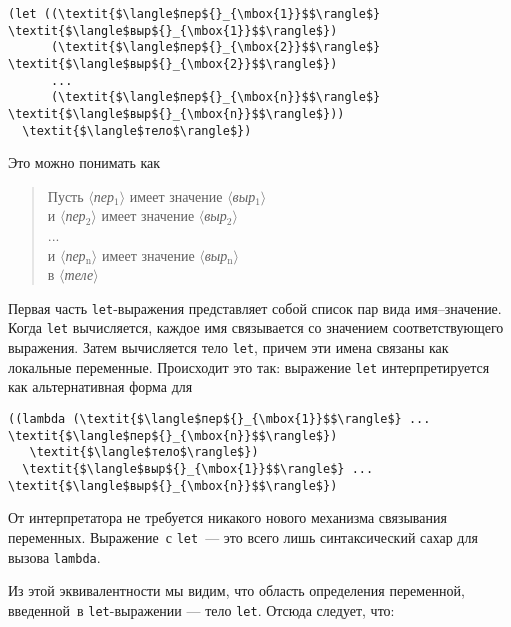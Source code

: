 \begin{Verbatim}[fontsize=\small]
(let ((\textit{$\langle$пер${}_{\mbox{1}}$$\rangle$} \textit{$\langle$выр${}_{\mbox{1}}$$\rangle$})
      (\textit{$\langle$пер${}_{\mbox{2}}$$\rangle$} \textit{$\langle$выр${}_{\mbox{2}}$$\rangle$})
      ...
      (\textit{$\langle$пер${}_{\mbox{n}}$$\rangle$} \textit{$\langle$выр${}_{\mbox{n}}$$\rangle$}))
  \textit{$\langle$тело$\rangle$})
\end{Verbatim}
Это можно понимать как

\begin{quote}
Пусть \textit{$\langle$пер${}_{\mbox{1}}$$\rangle$} имеет значение
\textit{$\langle$выр${}_{\mbox{1}}$$\rangle$}\\
и \textit{$\langle$пер${}_{\mbox{2}}$$\rangle$} имеет значение \textit{$\langle$выр${}_{\mbox{2}}$$\rangle$}\\
...\\
и \textit{$\langle$пер${}_{\mbox{n}}$$\rangle$} имеет значение \textit{$\langle$выр${}_{\mbox{n}}$$\rangle$}\\
в \textit{$\langle$теле$\rangle$}
\end{quote}
Первая часть {\tt let}-выражения представляет собой список пар
вида имя--зна\-че\-ние. Когда {\tt let} вычисляется, каждое имя
связывается со значением соответствующего выражения.  Затем
вычисляется тело {\tt let}, причем эти имена связаны как локальные
переменные.  Происходит это так:
выражение {\tt let} интерпретируется как альтернативная форма
для

\begin{Verbatim}[fontsize=\small]
((lambda (\textit{$\langle$пер${}_{\mbox{1}}$$\rangle$} ... \textit{$\langle$пер${}_{\mbox{n}}$$\rangle$})
   \textit{$\langle$тело$\rangle$})
  \textit{$\langle$выр${}_{\mbox{1}}$$\rangle$} ... \textit{$\langle$выр${}_{\mbox{n}}$$\rangle$})
\end{Verbatim}
От интерпретатора не требуется никакого нового механизма связывания
переменных.  Выражение~с {\tt let}~--- это всего лишь синтаксический
сахар для вызова {\tt lambda}.

Из этой эквивалентности мы видим, что область определения 
переменной, введенной~в {\tt let}-выражении --- тело
{\tt let}.  Отсюда следует, что:

